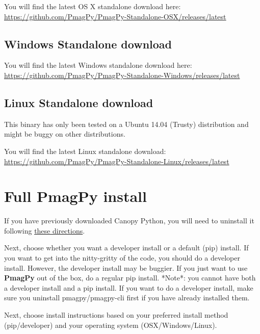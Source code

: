 \documentclass[11pt]{book}
\begin{document}
{\noindent You will find the latest OS X standalone download here: \href{https://github.com/PmagPy/PmagPy-Standalone-OSX/releases/latest}{https://github.com/PmagPy/PmagPy-Standalone-OSX/releases/latest}

\subsection{Windows Standalone download}

\noindent You will find the latest Windows standalone download here: \href{https://github.com/PmagPy/PmagPy-Standalone-Windows/releases/latest}{https://github.com/PmagPy/PmagPy-Standalone-Windows/releases/latest}

\subsection{Linux Standalone download}

This binary has only been tested on a Ubuntu 14.04 (Trusty) distribution and might be buggy on other distributions.

\noindent You will find the latest Linux standalone download: \href{https://github.com/PmagPy/PmagPy-Standalone-Linux/releases/latest}{https://github.com/PmagPy/PmagPy-Standalone-Linux/releases/latest}





\section{Full PmagPy install}


If you have previously downloaded Canopy Python, you will need to uninstall it following \href{https://support.enthought.com/hc/en-us/articles/204469700-Uninstalling-and-resetting-Canopy}{these directions}.

Next, choose whether you want a developer install or a default (pip) install.  If you want to get into the nitty-gritty of the code, you should do a developer install.  However, the developer install may be buggier.  If you just want to use {\bf PmagPy} out of the box, do a regular pip install.  *Note*: you cannot have both a developer install and a pip install.  If you want to do a developer install, make sure you uninstall pmagpy/pmagpy-cli first if you have already installed them.

Next, choose install instructions based on your preferred install method (pip/developer) and your operating system (OSX/Windows/Linux).

}
\end{document}
